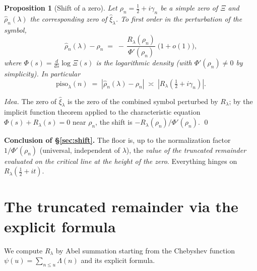 \documentclass[11pt]{article}
\theoremstyle{plain}
\newtheorem{proposition}{Proposition}
\theoremstyle{definition}
\newcommand{\xih}{\widehat{\xi}}
\newcommand{\Lam}{\Lambda}
\newcommand{\half}{\tfrac12}
\begin{document}
\begin{proposition}[Shift of a zero]\label{prop:shift}
Let $\rho_n=\half+i\gamma_n$ be a simple zero of $\Xi$ and $\widehat\rho_n(\lambda)$ the
corresponding zero of $\xih_\lambda$. To first order in the perturbation of the
symbol,
\begin{equation}\label{eq:shiftformula}
  \widehat\rho_n(\lambda)-\rho_n
  \;=\;-\,\frac{R_\lambda(\rho_n)}{\Phi'(\rho_n)}\;\bigl(1+o(1)\bigr),
\end{equation}
where $\Phi(s)=\frac{d}{ds}\log\Xi(s)$ is the logarithmic density
(with $\Phi'(\rho_n)\ne0$ by simplicity). In particular
\[
  \mathrm{piso}_\lambda(n)\;=\;|\widehat\rho_n(\lambda)-\rho_n|
  \;\asymp\;|R_\lambda(\half+i\gamma_n)| .
\]
\end{proposition}
\begin{proof}[Idea]
The zero of $\xih_\lambda$ is the zero of the combined symbol perturbed by
$R_\lambda$; by the implicit function theorem applied to the characteristic
equation $\Phi(s)+R_\lambda(s)=0$ near $\rho_n$, the shift is
$-R_\lambda(\rho_n)/\Phi'(\rho_n)$. \qed
\end{proof}

\noindent\textbf{Conclusion of \S\ref{sec:shift}.} The floor is, up to the
normalization factor $1/\Phi'(\rho_n)$ (universal, independent of $\lambda$), the
\emph{value of the truncated remainder evaluated on the critical line at the
height of the zero}. Everything hinges on $R_\lambda(\half+it)$.

\section{The truncated remainder via the explicit formula}\label{sec:explicit}

We compute $R_\lambda$ by Abel summation starting from the Chebyshev function
$\psi(u)=\sum_{n\le u}\Lam(n)$ and its explicit formula.
\end{document}
